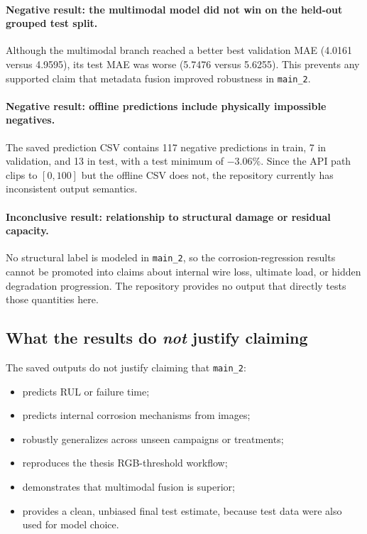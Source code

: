 \documentclass[11pt]{article}
\begin{document}
\paragraph{Negative result: the multimodal model did not win on the held-out grouped test split.}
Although the multimodal branch reached a better best validation MAE (4.0161 versus 4.9595), its test MAE was worse (5.7476 versus 5.6255). This prevents any supported claim that metadata fusion improved robustness in \texttt{main\_2}.

\paragraph{Negative result: offline predictions include physically impossible negatives.}
The saved prediction CSV contains 117 negative predictions in train, 7 in validation, and 13 in test, with a test minimum of \(-3.06\%\). Since the API path clips to \([0,100]\) but the offline CSV does not, the repository currently has inconsistent output semantics.

\paragraph{Inconclusive result: relationship to structural damage or residual capacity.}
No structural label is modeled in \texttt{main\_2}, so the corrosion-regression results cannot be promoted into claims about internal wire loss, ultimate load, or hidden degradation progression. The repository provides no output that directly tests those quantities here.

\subsection{What the results do \emph{not} justify claiming}
The saved outputs do not justify claiming that \texttt{main\_2}:
\begin{itemize}
  \item predicts RUL or failure time;
  \item predicts internal corrosion mechanisms from images;
  \item robustly generalizes across unseen campaigns or treatments;
  \item reproduces the thesis RGB-threshold workflow;
  \item demonstrates that multimodal fusion is superior;
  \item provides a clean, unbiased final test estimate, because test data were also used for model choice.
\end{itemize}
\end{document}
